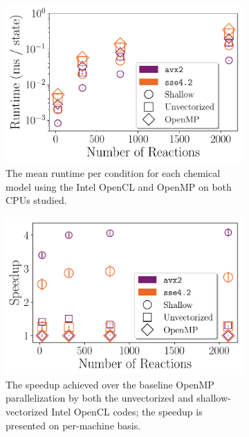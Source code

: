 \documentclass[12pt,number,sort&compress,preprint]{elsarticle}
\begin{document}
\begin{figure}[htbp!]
   \centering
  \begin{subfigure}[t]{0.48\linewidth}
      \includegraphics[width=\textwidth]{intel_source_nonorm.pdf}
      \caption{The mean runtime per condition for each chemical model using the Intel OpenCL and OpenMP on both CPUs studied.}
      \label{F:intel_source_nonorm}
  \end{subfigure}
  \hfill
  \begin{subfigure}[t]{0.48\linewidth}
      \includegraphics[width=\textwidth]{intel_source.pdf}
      \caption{The speedup achieved over the baseline OpenMP parallelization by both the unvectorized and shallow-vectorized Intel OpenCL codes; the speedup is presented on per-machine basis.}
      \label{F:intel_source}
  \end{subfigure}
  \\
  \begin{subfigure}[t]{0.48\linewidth}

\end{subfigure}
\end{figure}
\end{document}
